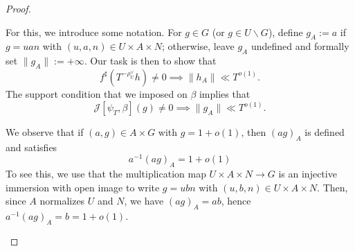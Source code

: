 \documentclass[reqno]{amsart}
\theoremstyle{plain} \newtheorem{theorem} {Theorem}
\theoremstyle{definition} \newtheorem{definition} [theorem] {Definition}
\theoremstyle{itplain} %
\numberwithin{equation}{section}
\numberwithin{theorem}{section}
\begin{document}
\begin{proof}
\begin{enumerate}[(i)]
    For this, we introduce some notation.  For $g \in G$ (or $g \in U \backslash G$), define $g_A := a$ if $g = u a n$ with $(u,a,n) \in U \times A \times N$; otherwise, leave $g_A$ undefined and formally set $\|g_A\| := +\infty$.  Our task is then to show that
    \begin{equation}\label{eq:f-t-}
      f ^\sharp (T ^{- \rho _U ^\vee } h) \neq 0
      \implies
      \|h_A\| \ll T^{o(1)}.
    \end{equation}
    The support condition that we imposed on $\beta$ implies that
    \begin{equation}\label{eq:mathc-betag-neq}
      \mathcal{J}[\psi_T,\beta](g) \neq 0 \implies \|g_A\| \ll T^{o(1)}.
    \end{equation}

    We observe that if $(a,g) \in A \times G$ with $g = 1 + o(1)$, then $(a g)_A$ is defined and satisfies
    \begin{equation}\label{eq:mathfraka-a-g}
      a^{-1} (a g)_A = 1 + o(1)
    \end{equation}
    To see this, we use that the multiplication map $U \times A \times N \rightarrow G$ is an injective immersion with open image to write $g = u b n$ with $(u,b,n) \in U \times A \times N$.  Then, since $A$ normalizes $U$ and $N$, we have $(a g)_A = a b$, hence $a^{-1} (a g)_A = b = 1 + o(1)$.


\end{enumerate}
\end{proof}
\end{document}
